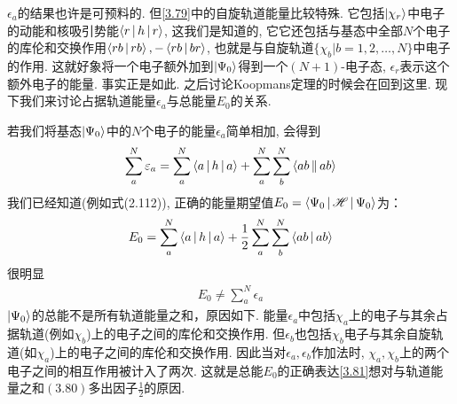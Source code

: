 $\epsilon_a$的结果也许是可预料的. 但\autoref{3.79}中的自旋轨道能量比较特殊. 
它包括$\Ket{\chi_r}$中电子的动能和核吸引势能$\Braket{r|h|r}$, 这我们是知道的, 
它它还包括与\hft 基态中全部$N$个电子的库伦和交换作用$\Braket{rb|rb},-\Braket{rb|br}$, 也就是与自旋轨道$\{\chi_b|b=1,2,\ldots,N\}$中电子的作用. 
这就好象将一个电子额外加到$\Ket{\Psi_0}$得到一个$(N+1)$-电子态, $\epsilon_r$表示这个额外电子的能量. 
事实正是如此. 之后讨论Koopmans定理的时候会在回到这里. 
现下我们来讨论占据轨道能量$\epsilon_a$与总能量$E_0$的关系.

若我们将基态$\Ket{\Psi_0}$中的$N$个电子的能量$\epsilon_a$简单相加, 
会得到
\begin{align}
	\sum_{a}^{N}\varepsilon_a = \sum_a^N\Braket{a|h|a} + \sum_a^N\sum_b^N\Braket{ab||ab}
\end{align}
我们已经知道(例如式(2.112)), 
正确的能量期望值$E_0 = \Braket{\Psi_0|\mathscr{H}|\Psi_0}$为：
\begin{align}
	\label{3.81}
	E_0 = \sum_a^N\Braket{a|h|a} + \frac{1}{2}\sum_a^N\sum_b^N\Braket{ab|ab}
\end{align}
很明显
\begin{align}
	E_0 \neq \sum_a^N \epsilon_a
\end{align}
$\Ket{\Psi_0}$的总能不是所有轨道能量之和，原因如下. 
能量$\epsilon_a$中包括$\chi_a$上的电子与其余占据轨道(例如$\chi_b$)上的电子之间的库伦和交换作用. 
但$\epsilon_b$也包括$\chi_b$电子与其余自旋轨道(如$\chi_a$)上的电子之间的库伦和交换作用. 
因此当对$\epsilon_a,\epsilon_b$作加法时, $\chi_a,\chi_b$上的两个电子之间的相互作用被计入了两次. 这就是总能$E_0$的正确表达\autoref{3.81}想对与轨道能量之和$(3.80)$多出因子$\frac{1}{2}$的原因.

